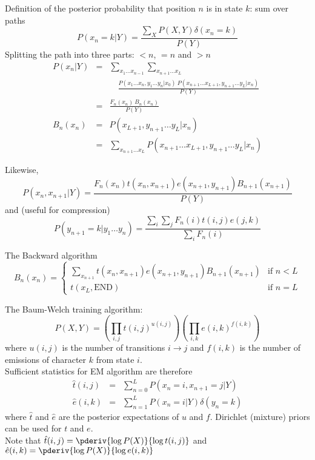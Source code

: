 \documentclass{beamer}
\begin{document}
\begin{frame}{}

\small

Definition of the posterior probability that position $n$ is in state $k$: sum over paths
\[
P(x_n=k|Y) = \frac{\sum_X P(X,Y) \delta(x_n=k)}{P(Y)}
\]
Splitting the path into three parts: $<n$, $=n$ and $>n$
\begin{eqnarray*}
P(x_n|Y)
& = & \sum_{x_1 \ldots x_{n-1}} \sum_{x_{n+1} \ldots x_L} \\
& & \quad \frac{P(x_1 \ldots x_n,y_1 \ldots y_n|x_0)\ P(x_{n+1} \ldots x_{L+1},y_{n+1} \ldots y_L|x_n)}{P(Y)} \\
& = & \frac{F_n(x_n)\ B_n(x_n)}{P(Y)} \\
B_n(x_n) & = & P(x_{L+1},y_{n+1} \ldots y_L|x_n) \\
& = & \sum_{x_{n+1} \ldots x_L} P(x_{n+1} \ldots x_{L+1}, y_{n+1} \ldots y_L|x_n)
\end{eqnarray*}
\end{frame}

\begin{frame}{}
\itemb

\item Likewise,
\[
P(x_n,x_{n+1}|Y) = \frac{F_n(x_n)t(x_n,x_{n+1})e(x_{n+1},y_{n+1})B_{n+1}(x_{n+1})}{P(Y)}
\]
and (useful for compression)
\[
P(y_{n+1}=k|y_1 \ldots y_n) = \frac{\sum_i \sum_j F_n(i) t(i,j) e(j,k)}{\sum_i F_n(i)}
\]
\item The Backward algorithm
\[
B_n(x_n) = \left\{ \begin{array}{ll} \displaystyle
\sum_{x_{n+1}} t(x_n,x_{n+1}) e(x_{n+1},y_{n+1}) B_{n+1}(x_{n+1}) & \mbox{if $n < L$} \\
t(x_L,\mbox{END}) & \mbox{if $n=L$}
\end{array} \right.
\]
\iteme
\end{frame}

\begin{frame}{}
\tiny
The Baum-Welch training algorithm:
\[
P(X,Y) = \left( \prod_{i,j} t(i,j)^{u(i,j)} \right) \left( \prod_{i,k} e(i,k)^{f(i,k)} \right)
\]
where $u(i,j)$ is the number of transitions $i \to j$ and $f(i,k)$ is the number of emissions of character $k$ from state $i$.
\\
Sufficient statistics for EM algorithm are therefore
\begin{eqnarray*}
\hat{t}(i,j) & = & \sum_{n=0}^L P(x_n=i,x_{n+1}=j|Y) \\
\hat{e}(i,k) & = & \sum_{n=1}^L P(x_n=i|Y) \delta(y_n=k)
\end{eqnarray*}
where $\hat{t}$ and $\hat{e}$ are the posterior expectations of $u$ and $f$.
Dirichlet (mixture) priors can be used for $t$ and $e$.
\\
Note that $\hat{t}(i,j) = \pderiv{\log P(X)}{\log t(i,j)}$ and $\hat{e}(i,k)=\pderiv{\log P(X)}{\log e(i,k)}$
\end{frame}
\end{document}

